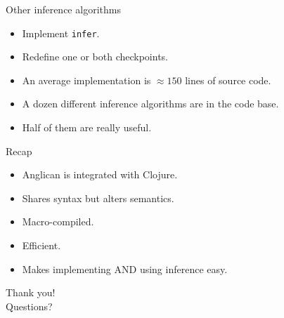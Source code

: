 \documentclass{beamer}
\begin{document}
\begin{frame}{Other inference algorithms}
    \begin{itemize}
        \item Implement \texttt{infer}.
        \item Redefine one or both checkpoints.
        \item An average implementation is $\approx 150$ lines of source
            code.
        \item A dozen different inference algorithms are in the
            code base.
        \item Half of them are really useful.
    \end{itemize}
\end{frame}

\begin{frame}{Recap}
    \begin{itemize}
        \item Anglican is integrated with Clojure.
        \item Shares syntax but alters semantics.
        \item Macro-compiled.
        \item Efficient.
        \item Makes implementing AND using inference easy.
    \end{itemize}
\end{frame}

\begin{frame}
    \LARGE
    \center
    Thank you!\\Questions?
\end{frame}
\end{document}
